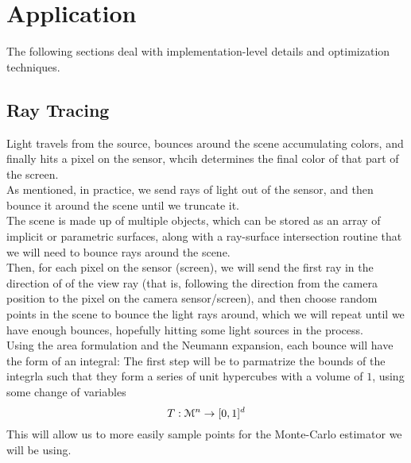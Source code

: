 \documentclass[12pt]{article}
\begin{document}
\newpage

\section*{Application}

The following sections deal with implementation-level
details and optimization techniques. \\

\newpage

\subsection*{Ray Tracing}

Light travels from the source, bounces around the
scene accumulating colors, and finally hits a pixel
on the sensor, whcih determines the final color
of that part of the screen. \\

As mentioned, in practice, we send rays of
light out of the sensor, and then bounce it around
the scene until we truncate it. \\

The scene is made up of multiple objects, which
can be stored as an array of implicit or parametric
surfaces, along with a ray-surface intersection
routine that we will need to bounce rays
around the scene. \\

Then, for each pixel on the sensor (screen), we will
send the first ray in the direction of of the view ray
(that is, following the direction from the camera position
to the pixel on the camera sensor/screen), and then choose
random points in the scene to bounce the light rays
around, which we will repeat until we have
enough bounces, hopefully hitting some light sources in
the process. \\

Using the area formulation and the Neumann expansion, 
each bounce will have the form of an integral:
The first step will be to parmatrize the bounds of the
integrla such that they form a series of unit hypercubes
with a volume of $1$, using some change of variables
\[ T: \mathcal{M}^n \to [0, 1]^d \]
This will allow us to more easily sample points
for the Monte-Carlo estimator we will be using. \\
\end{document}

